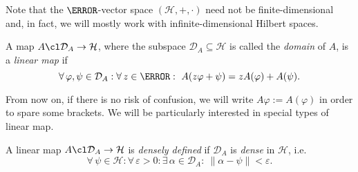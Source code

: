     Note that the $\C$-vector space $(\mathcal{H},+,\cdot)$ need not be finite-dimensional and, in fact, we will mostly work with infinite-dimensional Hilbert spaces. 

    \begin{definition}
        A map $A\cl\mathcal{D}_A\to \mathcal{H}$, where the subspace $\mathcal{D}_A\subseteq \mathcal{H}$ is called the \emph{domain} of $A$, is a \emph{linear map} if
        \begin{equation*}
        \forall \, \varphi,\psi\in\mathcal{D}_A:\forall \, z \in \C : \ A(z\varphi+\psi)=zA(\varphi)+A(\psi).
        \end{equation*}
    \end{definition}
    From now on, if there is no risk of confusion, we will write $A\varphi:=A(\varphi)$ in order to spare some brackets. We will be particularly interested in special types of linear map.




    \begin{definition}
        A linear map $A\cl\mathcal{D}_A\to \mathcal{H}$ is \emph{densely defined} if $\mathcal{D}_A$ is \emph{dense} in $\mathcal{H}$, i.e.\
        \begin{equation*}
            \forall \, \psi\in \mathcal{H} : \forall \, \varepsilon >0: \exists \, \alpha \in \mathcal{D}_A  :\ \|\alpha-\psi\|<\varepsilon.
        \end{equation*}
    \end{definition}

